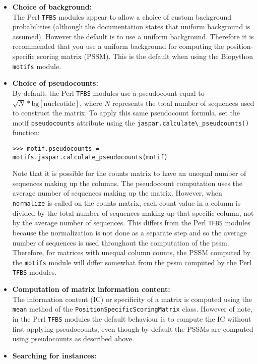 \begin{itemize}
\item{\bf Choice of background:} \\
The Perl \verb+TFBS+ modules appear to allow a choice of custom background probabilities (although the documentation states that uniform background is assumed). However the default is to use a uniform background. Therefore it is recommended that you use a uniform background for computing the position-specific scoring matrix (PSSM). This is the default when using the Biopython \verb+motifs+ module.
\item{\bf Choice of pseudocounts:} \\
By default, the Perl \verb+TFBS+ modules use a pseudocount equal to $\sqrt{N} * \textrm{bg}[\textrm{nucleotide}]$, where $N$ represents the total number of sequences used to construct the matrix. To apply this same pseudocount formula, set the motif \verb+pseudocounts+ attribute using the \verb+jaspar.calculate\_pseudcounts()+ function:
\begin{verbatim}
>>> motif.pseudocounts = motifs.jaspar.calculate_pseudocounts(motif)
\end{verbatim}
Note that it is possible for the counts matrix to have an unequal number of sequences making up the columns. The pseudocount computation uses the average number of sequences making up the matrix. However, when \verb+normalize+ is called on the counts matrix, each count value in a column is divided by the total number of sequences making up that specific column, not by the average number of sequences. This differs from the Perl \verb+TFBS+ modules because the normalization is not done as a separate step and so the average number of sequences is used throughout the computation of the pssm. Therefore, for matrices with unequal column counts, the PSSM computed by the \verb+motifs+ module will differ somewhat from the pssm computed by the Perl \verb+TFBS+ modules.
\item{\bf Computation of matrix information content:} \\
The information content (IC) or specificity of a matrix is computed using the \verb+mean+ method of the \verb+PositionSpecificScoringMatrix+ class. However of note, in the Perl \verb+TFBS+ modules the default behaviour is to compute the IC without first applying pseudocounts, even though by default the PSSMs are computed using pseudocounts as described above.
\item{\bf Searching for instances:} \\

\end{itemize}

